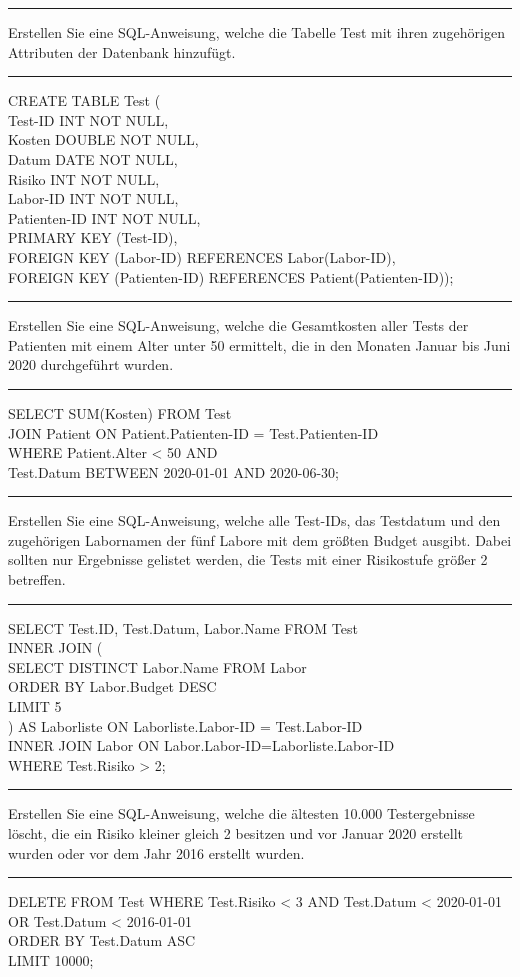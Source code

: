 \documentclass[5pt]{article}
\begin{document}
\begin{multicols*}{2}
\rule{\columnwidth}{0.5pt}
Erstellen Sie eine SQL-Anweisung, welche die Tabelle Test mit ihren zugehörigen
Attributen der Datenbank hinzufügt.
\rule{\columnwidth}{0.5pt}
CREATE TABLE Test (\\
Test-ID INT NOT NULL,\\
Kosten DOUBLE NOT NULL,\\
Datum DATE NOT NULL,\\
Risiko INT NOT NULL,\\
Labor-ID INT NOT NULL,\\
Patienten-ID INT NOT NULL,\\
PRIMARY KEY (Test-ID),\\
FOREIGN KEY (Labor-ID) REFERENCES Labor(Labor-ID),\\
FOREIGN KEY (Patienten-ID) REFERENCES Patient(Patienten-ID));\\
\rule{\columnwidth}{0.5pt}
Erstellen Sie eine SQL-Anweisung, welche die Gesamtkosten aller Tests der Patienten mit
einem Alter unter 50 ermittelt, die in den Monaten Januar bis Juni 2020 durchgeführt
wurden.
\rule{\columnwidth}{0.5pt}
SELECT SUM(Kosten) FROM Test\\
JOIN Patient ON Patient.Patienten-ID = Test.Patienten-ID\\
WHERE Patient.Alter < 50 AND\\
Test.Datum BETWEEN 2020-01-01 AND 2020-06-30;\\
\rule{\columnwidth}{0.5pt}
Erstellen Sie eine SQL-Anweisung, welche alle Test-IDs, das Testdatum und den
zugehörigen Labornamen der fünf Labore mit dem größten Budget ausgibt. Dabei sollten
nur Ergebnisse gelistet werden, die Tests mit einer Risikostufe größer 2 betreffen.
\rule{\columnwidth}{0.5pt}
SELECT Test.ID, Test.Datum, Labor.Name FROM Test\\
INNER JOIN (\\
SELECT DISTINCT Labor.Name FROM Labor\\
ORDER BY Labor.Budget DESC\\
LIMIT 5\\
) AS Laborliste ON Laborliste.Labor-ID = Test.Labor-ID\\
INNER JOIN Labor ON Labor.Labor-ID=Laborliste.Labor-ID\\
WHERE Test.Risiko > 2;\\
\rule{\columnwidth}{0.5pt}
Erstellen Sie eine SQL-Anweisung, welche die ältesten 10.000 Testergebnisse löscht, die
ein Risiko kleiner gleich 2 besitzen und vor Januar 2020 erstellt wurden oder vor dem Jahr
2016 erstellt wurden.
\rule{\columnwidth}{0.5pt}
DELETE FROM Test
WHERE Test.Risiko < 3 AND Test.Datum < 2020-01-01\\
OR Test.Datum < 2016-01-01\\
ORDER BY Test.Datum ASC\\
LIMIT 10000;

\end{multicols*}
\end{document}
